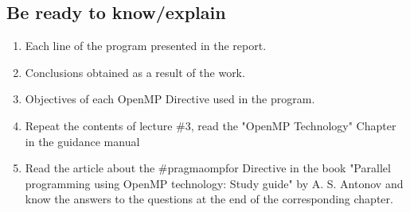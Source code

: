 { %
	\subsection{Be ready to know/explain}
	\begin{enumerate}
		\item Each line of the program presented in the report.
		\item Conclusions obtained as a result of the work.
		\item Objectives of each OpenMP Directive used in the program.
		\item Repeat the contents of lecture \#3, read the "OpenMP Technology" Chapter in the guidance manual
		\item Read the article about the \#pragma\textunderscore omp\textunderscore for Directive in the book "Parallel programming using OpenMP technology: Study guide" by A. S. Antonov and know the answers to the questions at the end of the corresponding chapter.
	\end{enumerate}
}